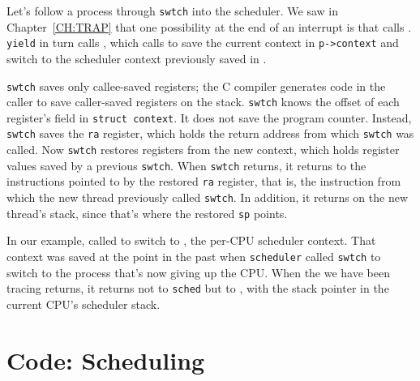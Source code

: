 Let's follow a process through
\lstinline{swtch} 
into the scheduler.
We saw in Chapter~\ref{CH:TRAP}
that one possibility at the end of an interrupt is that 
calls 
.
\lstinline{yield}
in turn calls
,
which calls
to save the current context in
\lstinline{p->context}
and switch to the scheduler context previously saved in 
.

\lstinline{swtch}
saves only callee-saved registers;
the C compiler generates code in the caller to save
caller-saved registers on the stack.
\lstinline{swtch} knows the offset of each
register's field in 
\lstinline{struct context}.
It does not save the program counter.
Instead,
\lstinline{swtch}
saves the
\lstinline{ra} register,
which holds the return address from which
\lstinline{swtch}
was called.
Now
\lstinline{swtch}
restores registers from the new context,
which holds register values saved by a previous
\lstinline{swtch}.
When 
\lstinline{swtch}
returns, it returns to the instructions pointed to
by the restored
\lstinline{ra}
register, that is,
the instruction from which the new thread previously
called \lstinline{swtch}.
In addition, it returns on the new thread's stack,
since that's where the restored \lstinline{sp} points.

In our example, 
called
to switch to
,
the per-CPU scheduler context.
That context was saved at the point in the past when
\lstinline{scheduler}
called
\lstinline{swtch}
to switch to the process that's now giving up the CPU.
When the
we have been tracing returns,
it returns not to
\lstinline{sched}
but to 
,
with the stack pointer in the current CPU's
scheduler stack.
\section{Code: Scheduling}


